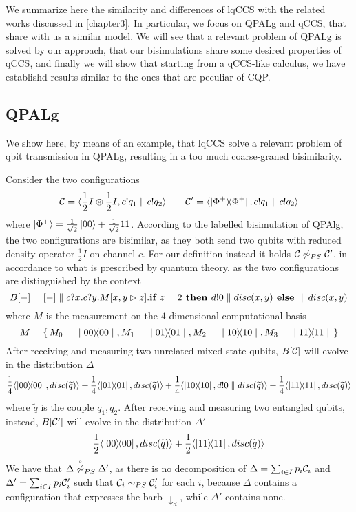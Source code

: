 We summarize here the similarity and differences of lqCCS with
the related works discussed in \ref{chapter3}.
In particular, we focus on QPALg and qCCS, that share with us a similar model.
We will see that a relevant problem of QPALg is solved by our approach, that
our bisimulations share some desired properties of qCCS, and finally we will show
that starting from a qCCS-like calculus, we have establishd results similar to the
ones that are peculiar of CQP.

\subsection{QPALg}
We show here, by means of an example, that lqCCS solve a relevant problem of qbit transmission in QPALg, resulting in a too much coarse-graned bisimilarity. 

Consider the two configurations
\[ \mathcal{C} = \langle\frac{1}{2}I \otimes \frac{1}{2}I, c!q_1 \parallel c!q_2\rangle \qquad \mathcal{C}' = \langle\ket{\Phi^+}\!\!\bra{\Phi^+}, c!q_1 \parallel c!q_2\rangle
\] where $\ket{\Phi^+} = \frac{1}{\sqrt{2}}\ket{00} + \frac{1}{\sqrt{2}}{11}$. According to the labelled bisimulation of QPAlg, the two configurations are bisimilar, as they both send two qubits with reduced density operator $\frac{1}{2}I$ on channel $c$. For our definition instead it holds $\mathcal{C} \not\sim_{PS} \mathcal{C}'$, in accordance to what is prescribed by quantum theory, as the two configurations are distinguished by the context \[B[{-}] = [{-}]\parallel c?x.c?y.M[x, y \rhd z].\textbf{if } z = 2 \textbf{ then } d!0 \parallel disc(x, y) \textbf{ else } \parallel disc(x, y)\] where $M$ is the measurement on the $4$-dimensional computational basis \[M = \set{M_0 = \proj{00}, M_1 = \proj{01}, M_2 = \proj{10}, M_3 = \proj{11}}\]
After receiving and measuring two unrelated mixed state qubits, $B[\mathcal{C}]$ will evolve in the distribution  $\Delta$
\[ \frac{1}{4}\confw{\proj{00}, disc(\widetilde{q})} + \frac{1}{4}\confw{\proj{01}, disc(\widetilde{q})} + \frac{1}{4}\confw{\proj{10}, d!0 \parallel disc(\widetilde{q})} + \frac{1}{4}\confw{\proj{11}, disc(\widetilde{q})} \] where $\widetilde{q}$ is the couple $q_1, q_2$.
After receiving and measuring two entangled qubits, instead, $B[\mathcal{C}']$ will evolve in the distribution $\Delta'$
\[ \frac{1}{2}\langle\ket{00}\!\!\bra{00}, disc(\widetilde{q})\rangle +  \frac{1}{2}\langle\ket{11}\!\!\bra{11}, disc(\widetilde{q})\rangle \] 
We have that $\Delta \stackrel{\scriptscriptstyle \circ}{\not\sim}_{PS} \Delta'$, as there is no decomposition of $\Delta = \sum_{i\in I} p_i \mathcal{C}_i$ and $\Delta' = \sum_{i\in I} p_i \mathcal{C}_i'$ such that $\mathcal{C}_i \sim_{PS} \mathcal{C}_i'$ for each $i$, because $\Delta$ contains a configuration that expresses the barb $\downarrow_d$, while $\Delta'$ contains none.

